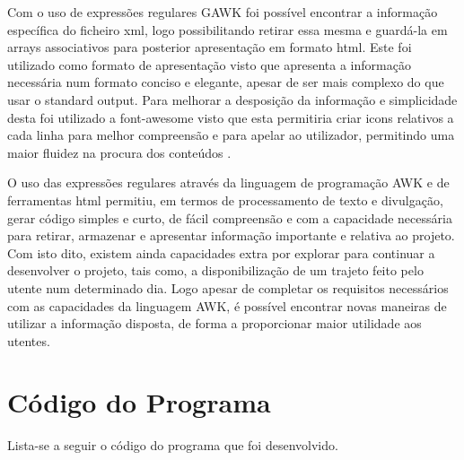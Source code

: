 \documentclass{report}
\begin{document}
Com o uso de expressões regulares GAWK foi possível encontrar a informação específica do ficheiro xml, logo possibilitando 
retirar essa mesma e guardá-la em arrays associativos
para posterior apresentação em formato html. Este foi utilizado como formato de apresentação visto que apresenta a informação 
necessária num formato conciso e elegante, 
apesar de ser mais complexo do que usar o standard output. Para melhorar a desposição da informação e simplicidade desta foi 
utilizado a font-awesome visto que esta permitiria criar 
icons relativos a cada linha para melhor compreensão e para apelar ao utilizador, permitindo uma maior fluidez na procura 
dos conteúdos .\par
O uso das expressões regulares através da linguagem de programação AWK e de ferramentas html permitiu, em termos de processamento 
de texto e divulgação, gerar código simples e curto,
de fácil compreensão e com a capacidade necessária para retirar, armazenar e apresentar informação importante e relativa ao projeto. 
Com isto dito, existem ainda capacidades extra
por explorar para continuar a desenvolver o projeto, tais como, a disponibilização de um trajeto feito pelo utente num determinado dia. 
Logo apesar de completar os requisitos necessários
com as capacidades da linguagem AWK, é possível encontrar novas maneiras de utilizar a informação disposta, de forma a proporcionar maior 
utilidade aos utentes.
   


\appendix 
\chapter{Código do Programa}

Lista-se a seguir o código  do programa  que foi desenvolvido.




\end{document}
